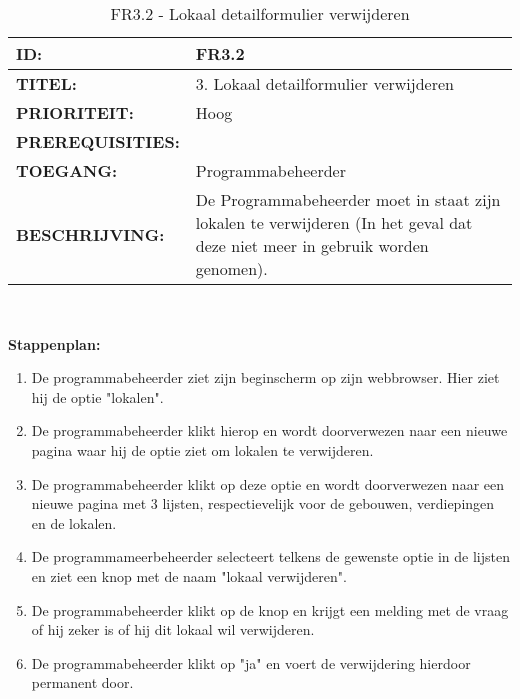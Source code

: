 \noindent\begin{table}[H]
            \begin{tabular}{l | p{10cm}}
                \textbf{ID:} & FR3.2 \\ \hline
                \textbf{TITEL:} & 3. Lokaal detailformulier verwijderen\\ \hline
                \textbf{PRIORITEIT:} &  Hoog \\ \hline
                \textbf{PREREQUISITIES:} & \\ \hline
                \textbf{TOEGANG:} & Programmabeheerder \\ \hline
                \textbf{BESCHRIJVING:} & De Programmabeheerder moet in staat zijn lokalen te verwijderen (In het geval dat deze niet meer in gebruik worden genomen).\\ 
            \end{tabular}\\
            \caption{FR3.2 - Lokaal detailformulier verwijderen}
            \label{tab:FR3.2- Lokaal detailformulier verwijderen}
        \end{table}
        
\textbf{Stappenplan:}       
\begin{enumerate}
\item De programmabeheerder ziet zijn beginscherm op zijn webbrowser. Hier ziet hij de optie "lokalen".
\item De programmabeheerder klikt hierop en wordt doorverwezen naar een nieuwe pagina waar hij de optie ziet om lokalen te verwijderen.
\item De programmabeheerder klikt op deze optie en wordt doorverwezen naar een nieuwe pagina met 3 lijsten, respectievelijk voor de gebouwen, verdiepingen en de lokalen.
\item De programmameerbeheerder selecteert telkens de gewenste optie in de lijsten en ziet een knop met de naam "lokaal verwijderen".
\item De programmabeheerder klikt op de knop en krijgt een melding met de vraag of hij zeker is of hij dit lokaal wil verwijderen.
\item De programmabeheerder klikt op "ja" en voert de verwijdering hierdoor permanent door.
\end{enumerate}      


